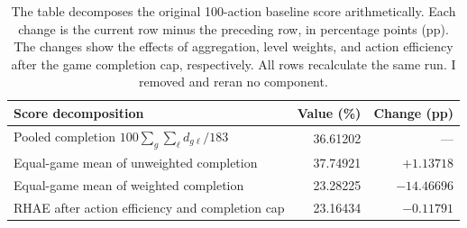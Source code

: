 \begin{table}[htbp]
\centering\small
\begin{tabularx}{\linewidth}{@{}Yrr@{}}\toprule
Score decomposition & Value (\%) & Change (pp)\\\midrule
Pooled completion $100\sum_g\sum_\ell d_{g\ell}/183$ & 36.61202 & ---\\
Equal-game mean of unweighted completion & 37.74921 & $+1.13718$\\
Equal-game mean of weighted completion & 23.28225 & $-14.46696$\\
RHAE after action efficiency and completion cap & 23.16434 & $-0.11791$\\\bottomrule
\end{tabularx}
\caption{The table decomposes the original 100-action baseline score arithmetically. Each change is the current row minus the preceding row, in percentage points (pp). The changes show the effects of aggregation, level weights, and action efficiency after the game completion cap, respectively. All rows recalculate the same run. I removed and reran no component.}\label{tab:decomposition}
\end{table}
